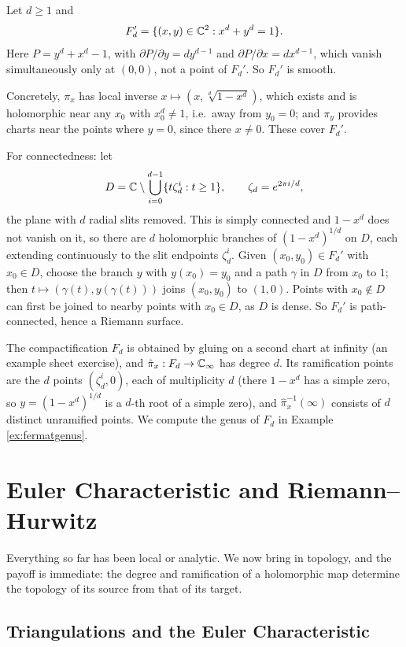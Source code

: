 \documentclass[a4paper]{scrartcl}
\newcommand{\Cinf}{\C_\infty}
\begin{document}
\begin{example}\label{ex:fermat}
	Let $d \geq 1$ and
	$$
	F_d' = \{(x,y)\in\mathbb{C}^2 : x^d + y^d = 1\}.
	$$
	Here $P = y^d + x^d - 1$, with $\partial P/\partial y = dy^{d-1}$ and
	$\partial P /\partial x = dx^{d-1}$, which vanish simultaneously only at $(0,0)$, not a
	point of $F_d'$. So $F_d'$ is smooth.

	Concretely, $\pi_x$ has local inverse $x \mapsto (x, \sqrt[d]{1-x^d})$, which exists
	and is holomorphic near any $x_0$ with $x_0^d \neq 1$, i.e.\ away from
	$y_0 = 0$; and $\pi_y$ provides charts near the points where $y = 0$, since there
	$x \ne 0$. These cover $F_d'$.

	For connectedness: let
	$$
	D = \mathbb{C}\setminus\bigcup_{i=0}^{d-1}\{t\zeta_d^i : t \geq 1\}, \qquad \zeta_d = e^{2\pi i/d},
	$$
	the plane with $d$ radial slits removed. This is simply connected and $1 - x^d$ does not
	vanish on it, so there are $d$ holomorphic branches of $(1-x^d)^{1/d}$ on $D$, each
	extending continuously to the slit endpoints $\zeta_d^i$. Given $(x_0,y_0)\in F_d'$ with
	$x_0\in D$, choose the branch $y$ with $y(x_0)=y_0$ and a path $\gamma$ in $D$ from
	$x_0$ to $1$; then $t\mapsto (\gamma(t), y(\gamma(t)))$ joins $(x_0,y_0)$ to $(1,0)$.
	Points with $x_0 \notin D$ can first be joined to nearby points with $x_0 \in D$, as $D$
	is dense. So $F_d'$ is path-connected, hence a Riemann surface.

	The compactification $F_d$ is obtained by gluing on a second chart at infinity (an
	example sheet exercise), and $\hat\pi_x : F_d \to \Cinf$ has degree $d$. Its
	ramification points are the $d$ points $(\zeta_d^i, 0)$, each of multiplicity $d$ (there
	$1 - x^d$ has a simple zero, so $y = (1-x^d)^{1/d}$ is a $d$-th root of a simple zero),
	and $\hat\pi_x^{-1}(\infty)$ consists of $d$ distinct unramified points. We compute the
	genus of $F_d$ in Example \ref{ex:fermatgenus}.
\end{example}

\section{Euler Characteristic and Riemann--Hurwitz}\label{sec:RH}

Everything so far has been local or analytic. We now bring in topology, and the payoff is
immediate: the degree and ramification of a holomorphic map determine the topology of its
source from that of its target.

\subsection{Triangulations and the Euler Characteristic}
\end{document}
